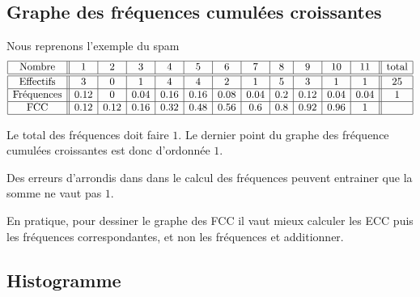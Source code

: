 \subsection{Graphe des fréquences cumulées croissantes}

Nous reprenons l'exemple du spam
\begin{equation*}
    \begin{array}[]{|c||c|c|c|c|c|c|c|c|c|c|c|| c |}
        \hline
        \text{Nombre}&1&2&3&4&5&6&7&8&9&10&11&\text{total}\\
        \hline\hline
        \text{Effectifs}&3&0&1&4&4&2&1&5&3&1&1&25\\
        \hline
        \text{Fréquences}&0.12&0&0.04&0.16&0.16&0.08&0.04&0.2&0.12&0.04&0.04&1\\
        \hline
        \text{FCC}&0.12&0.12&0.16&0.32&0.48&0.56&0.6&0.8&0.92&0.96&1&\\
        \hline
    \end{array}
\end{equation*}

\begin{center}

\end{center}

\begin{remark}
    Le total des fréquences doit faire \( 1\). Le dernier point du graphe des fréquence cumulées croissantes est donc d'ordonnée \( 1\).

    Des erreurs d'arrondis dans dans le calcul des fréquences peuvent entrainer que la somme ne vaut pas \( 1\).

    En pratique, pour dessiner le graphe des FCC il vaut mieux calculer les ECC puis les fréquences correspondantes, et non les fréquences et additionner.

\end{remark}

\subsection{Histogramme}

